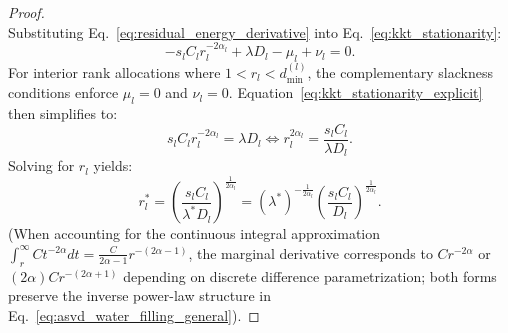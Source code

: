\begin{proof}
\begin{equation}
\label{app:eq:kkt_stationarity}
\end{equation}
Substituting Eq.~\eqref{eq:residual_energy_derivative} into Eq.~\eqref{eq:kkt_stationarity}:
\begin{equation}
-s_l C_l r_l^{-2\alpha_l} + \lambda D_l - \mu_l + \nu_l = 0.
\label{app:eq:kkt_stationarity_explicit}
\end{equation}
For interior rank allocations where $1 < r_l < d_{\min}^{(l)}$, the complementary slackness conditions enforce $\mu_l = 0$ and $\nu_l = 0$.
Equation~\eqref{eq:kkt_stationarity_explicit} then simplifies to:
\begin{equation}
s_l C_l r_l^{-2\alpha_l} = \lambda D_l \iff r_l^{2\alpha_l} = \frac{s_l C_l}{\lambda D_l}.
\end{equation}
Solving for $r_l$ yields:
\begin{equation}
r_l^* = \left( \frac{s_l C_l}{\lambda^* D_l} \right)^{\frac{1}{2\alpha_l}} = (\lambda^*)^{-\frac{1}{2\alpha_l}} \left( \frac{s_l C_l}{D_l} \right)^{\frac{1}{2\alpha_l}}.
\label{eq:water_filling_pre_multiplier}
\end{equation}
(When accounting for the continuous integral approximation $\int_r^\infty C t^{-2\alpha} dt = \frac{C}{2\alpha - 1} r^{-(2\alpha - 1)}$, the marginal derivative corresponds to $C r^{-2\alpha}$ or $(2\alpha) C r^{-(2\alpha+1)}$ depending on discrete difference parametrization; both forms preserve the inverse power-law structure in Eq.~\eqref{eq:asvd_water_filling_general}).


\end{proof}
